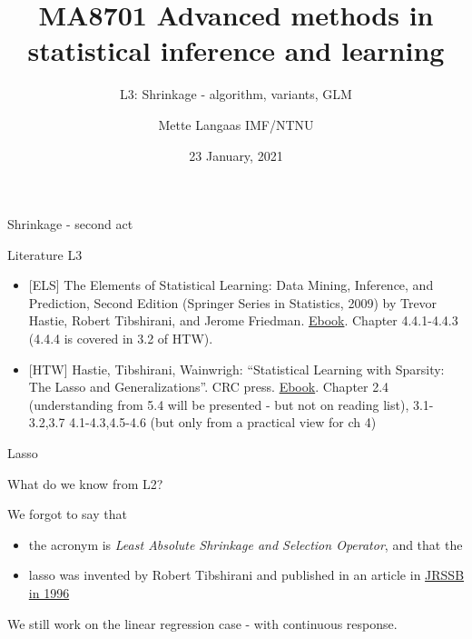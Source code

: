 \documentclass[
  ignorenonframetext,
]{beamer}
\title{MA8701 Advanced methods in statistical inference and learning}
\subtitle{L3: Shrinkage - algorithm, variants, GLM}
\author{Mette Langaas IMF/NTNU}
\date{23 January, 2021}
\providecommand{\tightlist}{%
  \setlength{\itemsep}{0pt}\setlength{\parskip}{0pt}}
\begin{document}
\frame{\titlepage}

\begin{frame}{Shrinkage - second act}
\protect\hypertarget{shrinkage---second-act}{}

\begin{block}{Literature L3}

\begin{itemize}
\item
  {[}ELS{]} The Elements of Statistical Learning: Data Mining,
  Inference, and Prediction, Second Edition (Springer Series in
  Statistics, 2009) by Trevor Hastie, Robert Tibshirani, and Jerome
  Friedman.
  \href{https://web.stanford.edu/~hastie/Papers/ESLII.pdf}{Ebook}.
  Chapter 4.4.1-4.4.3 (4.4.4 is covered in 3.2 of HTW).
\item
  {[}HTW{]} Hastie, Tibshirani, Wainwrigh: ``Statistical Learning with
  Sparsity: The Lasso and Generalizations''. CRC press.
  \href{https://trevorhastie.github.io/}{Ebook}. Chapter 2.4
  (understanding from 5.4 will be presented - but not on reading list),
  3.1-3.2,3.7 4.1-4.3,4.5-4.6 (but only from a practical view for ch 4)
\end{itemize}

\end{block}

\end{frame}

\begin{frame}{Lasso}
\protect\hypertarget{lasso}{}

What do we know from L2?

We forgot to say that

\begin{itemize}
\tightlist
\item
  the acronym is \emph{Least Absolute Shrinkage and Selection Operator},
  and that the
\item
  lasso was invented by Robert Tibshirani and published in an article in
  \href{https://www.jstor.org/stable/2346178?seq=1}{JRSSB in 1996}
\end{itemize}

We still work on the linear regression case - with continuous response.

\end{frame}
\end{document}
